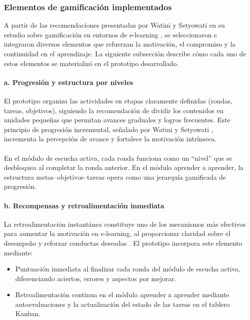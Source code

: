\subsubsection{Elementos de gamificación implementados}

A partir de las recomendaciones presentadas por Watini y Setyowati en su estudio sobre gamificación en entornos de e-learning \cite{watini2023gamification}, se seleccionaron e integraron diversos elementos que refuerzan la motivación, el compromiso y la continuidad en el aprendizaje. La siguiente subsección describe cómo cada uno de estos elementos se materializó en el prototipo desarrollado.

\paragraph{a. Progresión y estructura por niveles}

El prototipo organiza las actividades en etapas claramente definidas (rondas, tareas, objetivos), siguiendo la recomendación de dividir los contenidos en unidades pequeñas que permitan avances graduales y logros frecuentes. Este principio de progresión incremental, señalado por Watini y Setyowati \cite{watini2023gamification}, incrementa la percepción de avance y fortalece la motivación intrínseca.
\\
\\
En el módulo de escucha activa, cada ronda funciona como un “nivel” que se desbloquea al completar la ronda anterior.  
En el módulo aprender a aprender, la estructura metas–objetivos–tareas opera como una jerarquía gamificada de progresión.

\paragraph{b. Recompensas y retroalimentación inmediata}

La retroalimentación instantánea constituye uno de los mecanismos más efectivos para aumentar la motivación en e-learning, al proporcionar claridad sobre el desempeño y reforzar conductas deseadas \cite{watini2023gamification}. El prototipo incorpora este elemento mediante:

\begin{itemize}
    \item Puntuación inmediata al finalizar cada ronda del módulo de escucha activa, diferenciando aciertos, errores y aspectos por mejorar.
    \item Retroalimentación continua en el módulo aprender a aprender mediante autoevaluaciones y la actualización del estado de las tareas en el tablero Kanban.
\end{itemize}

